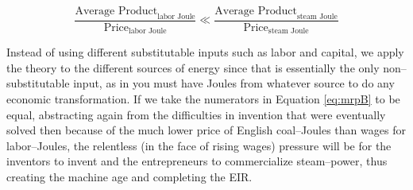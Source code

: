 		\begin{equation}
		\label{eq:mrpB}
		\frac{\text{Average Product}_{\text{labor Joule}}}{\text{Price}_{\text{labor Joule}}} \ll \frac{\text{Average Product}_{\text{steam Joule}}}{\text{Price}_{\text{steam Joule}}}
		\end{equation}

\vspace*{21.5pt}
Instead of using different substitutable inputs such as labor and capital, we apply the theory to the different sources of energy since that is essentially the only non--substitutable input, as in you must have Joules from whatever source to do any economic transformation. If we take the numerators in Equation \ref{eq:mrpB} to be equal, abstracting again from the difficulties in invention that were eventually solved then because of the much lower price of English coal--Joules than wages for labor--Joules, the relentless (in the face of rising wages) pressure will be for the inventors to invent and the entrepreneurs to commercialize steam--power, thus creating the machine age and completing the EIR.
